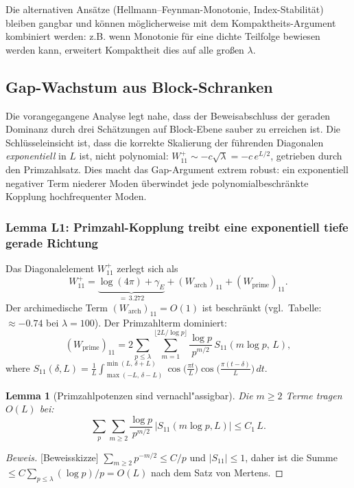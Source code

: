 \documentclass[12pt,a4paper]{article}
\newtheorem{lemma}[theorem]{Lemma}
\theoremstyle{definition}
\theoremstyle{remark}
\begin{document}
Die alternativen Ansätze (Hellmann--Feynman-Monotonie, Index-Stabilität) bleiben gangbar und können möglicherweise mit dem Kompaktheits-Argument kombiniert werden: z.B. wenn Monotonie für eine dichte Teilfolge bewiesen werden kann, erweitert Kompaktheit dies auf alle großen $\lambda$.

\subsection{Gap-Wachstum aus Block-Schranken}
\label{sec:gap-growth-block}

Die vorangegangene Analyse legt nahe, dass der Beweisabschluss der geraden Dominanz durch drei Schätzungen auf Block-Ebene sauber zu erreichen ist. Die Schlüsseleinsicht ist, dass die korrekte Skalierung der führenden Diagonalen \emph{exponentiell} in $L$ ist, nicht polynomial: $W_{11}^+ \sim -c\sqrt{\lambda} = -c\,e^{L/2}$, getrieben durch den Primzahlsatz. Dies macht das Gap-Argument extrem robust: ein exponentiell negativer Term niederer Moden überwindet jede polynomialbeschränkte Kopplung hochfrequenter Moden.

\subsubsection{Lemma L1: Primzahl-Kopplung treibt eine exponentiell tiefe gerade Richtung}

Das Diagonalelement $W_{11}^+$ zerlegt sich als
\begin{equation}
\label{eq:W11-decomp}
  W_{11}^+ = \underbrace{\log(4\pi) + \gamma_E}_{=\,3.272} + (W_{\mathrm{arch}})_{11} + (W_{\mathrm{prime}})_{11}.
\end{equation}
Der archimedische Term $(W_{\mathrm{arch}})_{11} = O(1)$ ist beschränkt (vgl.\ Tabelle: $\approx -0.74$ bei $\lambda = 100$). Der Primzahlterm dominiert:
\[
  (W_{\mathrm{prime}})_{11} = 2\sum_{p \leq \lambda}\sum_{m=1}^{\lfloor 2L/\log p\rfloor} \frac{\log p}{p^{m/2}}\,S_{11}(m\log p,\,L),
\]
where $S_{11}(\delta, L) = \frac{1}{L}\int_{\max(-L,\,\delta-L)}^{\min(L,\,\delta+L)} \cos\!\bigl(\frac{\pi t}{L}\bigr)\cos\!\bigl(\frac{\pi(t-\delta)}{L}\bigr)\,dt$.

\begin{lemma}[Primzahlpotenzen sind vernachl"assigbar]
\label{lem:m1-dominance}
Die $m \geq 2$ Terme tragen $O(L)$ bei:
\[
  \sum_p \sum_{m \geq 2} \frac{\log p}{p^{m/2}}\,|S_{11}(m\log p, L)| \leq C_1\,L.
\]
\end{lemma}
\begin{proof}[Beweis][Beweisskizze]
$\sum_{m \geq 2} p^{-m/2} \leq C/p$ und $|S_{11}| \leq 1$, daher ist die Summe $\leq C\sum_{p \leq \lambda} (\log p)/p = O(L)$ nach dem Satz von Mertens.
\end{proof}
\end{document}
